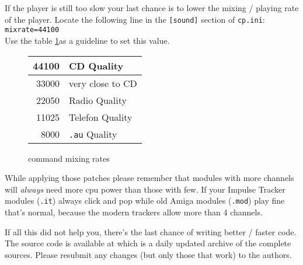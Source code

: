 If the player is still too slow your last chance is to lower the mixing /
playing rate of the player. Locate the following line in the \texttt{[sound]}
section of \texttt{cp.ini}: \\
\texttt{mixrate=44100} \\
Use the table \ref{mixingrate}as a guideline to set this value.

\begin{figure}[htb]
\caption{\label{mixingrate}command mixing rates}
\begin{tabular}{|r|l|}
\hline 
44100 & CD Quality \\ \hline
33000 & very close to CD \\ \hline
22050 & Radio Quality \\ \hline
11025 & Telefon Quality \\ \hline
8000  & \texttt{.au} Quality \\ \hline
\end{tabular}
\end{figure}

While applying those patches please remember that modules with more channels
will \emph{always} need more cpu power than those with few. If your Impulse
Tracker modules (\texttt{.it}) always click and pop while old Amiga modules
(\texttt{.mod}) play fine that's normal, because the modern trackers allow
more than 4 channels.

If all this did not help you, there's the last chance of writing better / faster
code. The source code is available at
which is a daily updated archive of the complete sources. Please resubmit any
changes (but only those that work) to the authors.

\clearpage
